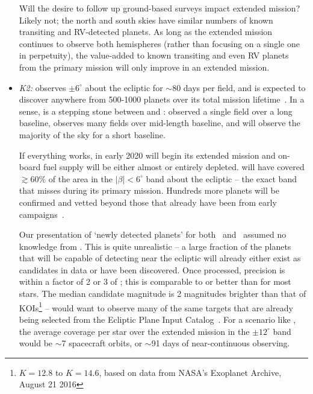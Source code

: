 \begin{itemize}
	Will the desire to follow up ground-based surveys impact \tesss extended mission?
	Likely not; the north and south skies have similar numbers of known transiting and RV-detected planets.
	As long as the extended mission continues to observe both hemispheres (rather than focusing on a single one in perpetuity), the value-added to known transiting and even RV planets from the primary mission will only improve in an extended mission.

	\item \textit{K2:}
	\ktwo observes $\pm6^\circ$ about the ecliptic for $\sim$80 days per field, and is expected to discover anywhere from 500-1000 planets over its total mission lifetime~\citep{howell_k2_2014,crossfield_197_2016}.
	In a sense, \ktwo is a stepping stone between \kepler and \tess\!: \kepler observed a single field over a long baseline, \ktwo observes many fields over mid-length baseline, and \tess will observe the majority of the sky for a short baseline.
	
	If everything works, in early 2020 \tess will begin its extended mission and \ktwos on-board fuel supply will be either almost or entirely depleted.
	\ktwo will have covered $\gtrsim60\%$ of the area in the $|\beta|<6^\circ$ band about the ecliptic -- the exact band that \tess misses during its primary mission.
	Hundreds more \ktwo planets will be confirmed and vetted beyond those that already have been from early campaigns~\citep{foreman-mackey_k2_2015,vanderburg_234_2016,crossfield_197_2016}.
	
	Our presentation of `newly detected planets' for both \elong\ and \eshort\ assumed no knowledge from \ktwo\!.
	This is quite unrealistic -- a large fraction of the planets that \tess will be capable of detecting near the ecliptic will already either exist as candidates in \ktwos data or have been discovered.
	Once processed, \ktwos precision is within a factor of 2 or 3 of \keplers\!; this is comparable to or better than \tess for most stars.
	The median \ktwo candidate magnitude is 2 \kepler magnitudes brighter than that of KOIs\footnote{$K=12.8$ to $K=14.6$, based on data from NASA's Exoplanet Archive, August 21 2016} -- \tess would want to observe many of the same targets that are already being selected from the Ecliptic Plane Input Catalog~\citep{huber_epic_2016}.
	For a scenario like \elong, the average \tess coverage per star over the extended mission in the $\pm12^\circ$ band would be $\sim$7 spacecraft orbits, or $\sim$91 days of near-continuous observing.
	

\end{itemize}
